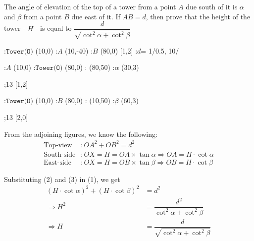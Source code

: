 

\question[3]  The angle of elevation of the top of a tower from a point $A$
due south of it is $\alpha$ and $\beta$ from a point $B$ due east of it. If $AB=d$, 
then prove that the height of the tower - $H$ - is equal to 
$\dfrac{d}{\sqrt{\cot^2\alpha + \cot^2\beta}}$


\ifprintanswers
	\begin{marginfigure}
    :$\texttt{Tower(O)}$ (10,0)
    :$A$ (10,-40)
    :$B$ (80,0)
     [1,2]
    :$d$= 1/0.5, 10/
		\figdrawbegin{}
			\figdrawline[0,1,2,0]
		\figdrawend
		\centerline{\box\figBoxA}
	\end{marginfigure}

  \begin{marginfigure}[0.5cm]
      :$A$ (10,0)
      :$\texttt{Tower(O)}$ (80,0)
      : (80,50)
      :$\alpha$ (30,3)

    \figdrawbegin{}
      \figdrawline [0,1,2,0]
      ;13 [1,2]
    \figdrawend
		\centerline{\box\figBoxA}
  \end{marginfigure}

  \begin{marginfigure}[0.5cm]
      :$\texttt{Tower(O)}$ (10,0)
      :$B$ (80,0)
      : (10,50)
      :$\beta$ (60,3)

    \figdrawbegin{}
      \figdrawline [0,1,2,0]
      ;13 [2,0]
    \figdrawend
		\centerline{\box\figBoxA}
  \end{marginfigure}
\fi  

\begin{solution}[\fullpage]
	From the adjoining figures, we know the following:
	\begin{align}
		\text{Top-view} &: OA^2 + OB^2 = d^2 \\
		\text{South-side} &: OX = H = OA \times\tan\alpha \Rightarrow OA = H\cdot\cot\alpha \\
		\text{East-side} &: OX = H = OB \times\tan\beta \Rightarrow OB = H\cdot\cot\beta
	\end{align}
	
	Substituting (2) and (3) in (1), we get
	\begin{align}
		(H\cdot\cot\alpha)^2 + (H\cdot\cot\beta)^2 &= d^2 \\
		\Rightarrow H^2 &= \dfrac{d^2}{\cot^2\alpha + \cot^2\beta} \\
		\Rightarrow H &= \dfrac{d}{\sqrt{\cot^2\alpha + \cot^2\beta}}
	\end{align}
\end{solution}
